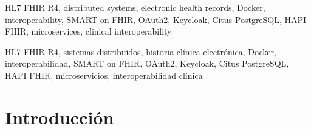 \documentclass[conference]{IEEEtran}
\begin{document}
\begin{IEEEkeywords}
HL7 FHIR R4, distributed systems, electronic health records, Docker,
interoperability, SMART on FHIR, OAuth2, Keycloak, Citus PostgreSQL,
HAPI FHIR, microservices, clinical interoperability
\end{IEEEkeywords}

\begin{abstract}
La fragmentaci\'on de la informaci\'on cl\'inica entre instituciones
de salud es un problema global que compromete la seguridad del paciente
y la continuidad asistencial. Seg\'un la Organizaci\'on Mundial de la
Salud, m\'as del 50\% de los errores m\'edicos se asocian a informaci\'on
incompleta o no disponible en el punto de atenci\'on. Este art\'iculo
presenta el dise\~no e implementaci\'on de un prototipo de historia
cl\'inica electr\'onica distribuida basado en HL7 FHIR R4, servidores
HAPI FHIR, contenedores Docker y una base de datos distribuida Citus
PostgreSQL. La metodolog\'ia sigui\'o un enfoque Agile iterativo
estructurado en cuatro fases: dise\~no arquitect\'onico, despliegue de
infraestructura, desarrollo de interfaz cl\'inica y validaci\'on
funcional. Los resultados se presentan como evidencia experimental
organizada por stack tecnol\'ogico. El proyecto demuestra que est\'andares
de interoperabilidad de vanguardia y microservicios contenerizados
pueden sostener arquitecturas cl\'inicas escalables con herramientas
de c\'odigo abierto.
\end{abstract}

\begin{IEEEkeywords}
HL7 FHIR R4, sistemas distribuidos, historia cl\'inica electr\'onica,
Docker, interoperabilidad, SMART on FHIR, OAuth2, Keycloak,
Citus PostgreSQL, HAPI FHIR, microservicios, interoperabilidad cl\'inica
\end{IEEEkeywords}


\section{Introducci\'on}
\end{document}

